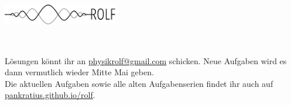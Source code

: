 \documentclass[a4paper]{article}
\begin{document}
	\vspace*{-1cm}
	\parbox{4cm}{\vspace{-0.2cm}\includegraphics[width=5cm]{../images/logo_scaled.pdf}}
	\parbox{10.6cm}{ \\
			\vspace*{0.3cm} }
		\vspace{0.5cm}

\thispagestyle{empty}
\begin{framed}
	\noindent
	\scriptsize
	 Lösungen könnt ihr an \href{mailto:physikrolf@gmail.com}{physikrolf@gmail.com} schicken.
	 Neue Aufgaben wird es dann vermutlich wieder Mitte Mai geben.
	 \\ Die aktuellen Aufgaben sowie alle alten Aufgabenserien findet ihr auch auf \url{pankratius.github.io/rolf}.
\end{framed}

\noindent




\end{document}
